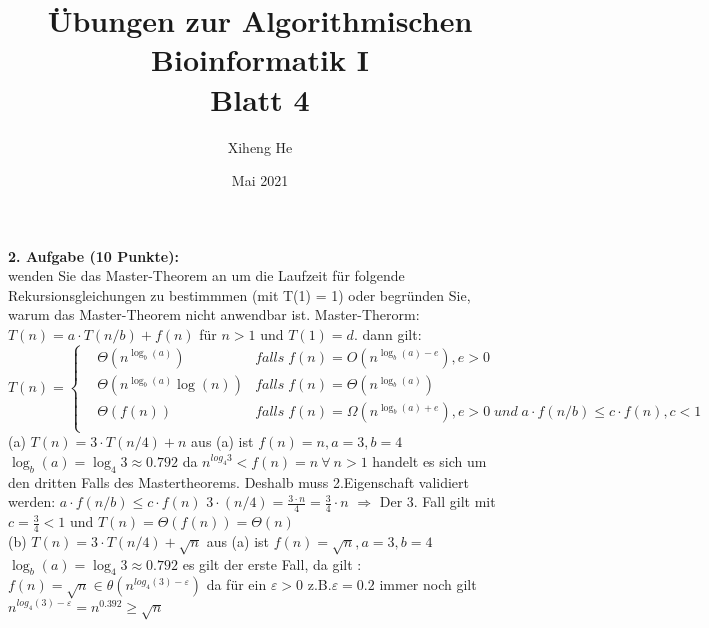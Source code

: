 \documentclass{article}
\title{Übungen zur Algorithmischen Bioinformatik I\\
Blatt 4}
\author{Xiheng He}
\date{Mai 2021}
\begin{document}
\maketitle
\begin{flushleft}
\textbf{2. Aufgabe (10 Punkte):}\\
wenden Sie das Master-Theorem an um die Laufzeit für folgende Rekursionsgleichungen zu bestimmmen (mit T(1) = 1) oder begründen Sie, warum das Master-Theorem nicht anwendbar ist.
\newline
Master-Therorm: $T(n) = a \cdot T(n/b) + f(n)$ für $n > 1$ und $T(1) = d$. dann gilt:
    $$ T(n)=\left\{
    \begin{aligned}
    &\Theta(n^{\log_b (a)}) & falls \; f(n) = O(n^{\log_b (a)-e}), e > 0 \\
    &\Theta(n^{\log_b (a)}\log(n)) & falls \; f(n) = \Theta(n^{\log_b(a)})\\
    &\Theta(f(n)) & falls \; f(n) = \Omega(n^{\log_b(a) + e}), e > 0 \; und \; a \cdot f(n/b) \le c \cdot f(n), c < 1\\ 
    \end{aligned}
    \right.
    $$
\newline
(a) $T(n) = 3 \cdot T(n/4) + n$
\newline
aus (a) ist $f(n) = n, a = 3, b = 4$
\newline
$\log_b(a) = \log_4 3 \approx 0.792$
\newline
da $n^{log_4 3} < f(n)=n \ \forall  \ n > 1$ handelt es sich um den dritten Falls des Mastertheorems.
\newline
Deshalb muss 2.Eigenschaft validiert werden: $a\cdot f(n/b) \leq c\cdot f(n)$
\newline
$3\cdot (n/4)= \frac{3 \cdot n}{4}= \frac{3}{4}\cdot n$
\newline
$\Longrightarrow$ Der 3. Fall gilt mit $c=\frac{3}{4}<1$ und $T(n)=\Theta(f(n))=\Theta(n)$
\newline\\
(b) $T(n) = 3 \cdot T(n/4) + \sqrt{n}$
\newline
aus (a) ist $f(n) = \sqrt{n}, a = 3, b = 4$
\newline
$\log_b(a) = \log_4 3 \approx 0.792$
\newline 
es gilt der erste Fall, da gilt :
\newline
$f(n)=\sqrt{n} \in \theta (n^{log_4(3)-\varepsilon}) $
\newline
da für ein $\varepsilon > 0$ z.B.$\varepsilon =0.2$ immer noch gilt $n^{log_4(3)-\varepsilon}=n^{0.392} \ge \sqrt{n} $

\end{flushleft}
\end{document}
